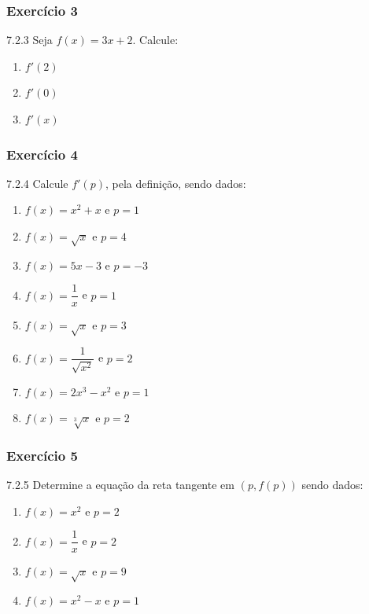 \subsubsection*{Exercício 3}
\begin{exercicio}[3]{7.2.3}
Seja $f(x) = 3x + 2$. Calcule:
\begin{enumerate}[label=\alph*)]
    \item $f'(2)$
    \item $f'(0)$
    \item $f'(x)$
\end{enumerate}
\end{exercicio}

\subsubsection*{Exercício 4}
\begin{exercicio}[4]{7.2.4}
Calcule $f'(p)$, pela definição, sendo dados:
\begin{enumerate}[label=\alph*)]
    \item $f(x) = x^2 + x$ e $p = 1$
    \item $f(x) = \sqrt{x}$ e $p = 4$
    \item $f(x) = 5x - 3$ e $p = -3$
    \item $f(x) = \dfrac{1}{x}$ e $p = 1$
    \item $f(x) = \sqrt{x}$ e $p = 3$
    \item $f(x) = \dfrac{1}{\sqrt{x^2}}$ e $p = 2$
    \item $f(x) = 2x^3 - x^2$ e $p = 1$
    \item $f(x) = \sqrt[3]{x}$ e $p = 2$
\end{enumerate}
\end{exercicio}

\subsubsection*{Exercício 5}
\begin{exercicio}[5]{7.2.5}
Determine a equação da reta tangente em $(p, f(p))$ sendo dados:
\begin{enumerate}[label=\alph*)]
    \item $f(x) = x^2$ e $p = 2$
    \item $f(x) = \dfrac{1}{x}$ e $p = 2$
    \item $f(x) = \sqrt{x}$ e $p = 9$
    \item $f(x) = x^2 - x$ e $p = 1$
\end{enumerate}
\end{exercicio}

